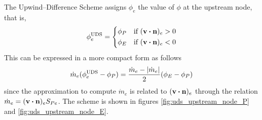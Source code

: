 The Upwind--Difference Scheme assigns $\phi_e$ the value of $\phi$ at the upstream node, that is,
\begin{equation}
	\phi_e^\text{UDS} = 
	\left\{
	\begin{aligned}
		&\phi_P & &\text{if } (\vb{v} \vdot \vb{n})_e > 0 \\
		&\phi_E & &\text{if } (\vb{v} \vdot \vb{n})_e < 0 \\
	\end{aligned}
	\right.
\end{equation}
This can be expressed in a more compact form as follows
\begin{equation}
	\dot{m}_e ( \phi_e^\text{UDS} - \phi_P ) = 
	\frac{\dot{m}_e - \abs{\dot{m}_e}}{2} ( \phi_E - \phi_P )
\end{equation}
since the approximation to compute $\dot{m}_e$ is related to $(\vb{v} \vdot \vb{n})_e$ through the relation $\dot{m}_e = (\vb{v} \vdot \vb{n})_e S_{Pe}$. The scheme is shown in figures \ref{fig:uds_upstream_node_P} and \ref{fig:uds_upstream_node_E}.

